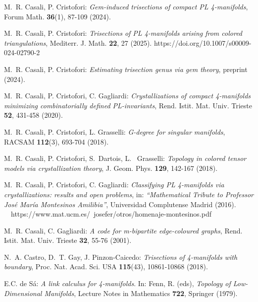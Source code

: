 \documentclass[12pt,a4paper]{article}
\begin{document}
\begin{thebibliography}{00}
{ 
M.~R. Casali, P. Cristofori: {\it Gem-induced trisections of compact PL 4-manifolds},  Forum Math. {\bf 36}(1), 87-109 (2024).  

M.~R. Casali, P. Cristofori: {\it Trisections of PL 4-manifolds arising from colored triangulations},  Mediterr. J. Math. {\bf 22}, 27 (2025). https://doi.org/10.1007/s00009-024-02790-2


M.~R. Casali, P. Cristofori: {\it Estimating trisection genus via gem theory}, 
preprint (2024). 


M.~R. Casali, P. Cristofori, C. Gagliardi:  {\it Crystallizations of compact 4-manifolds minimizing combinatorially defined PL-invariants}, Rend. Istit. Mat. Univ. Trieste {\bf 52}, 431-458 (2020).  %

M.~R. Casali, P. Cristofori, L. Grasselli: {\it G-degree for singular manifolds}, RACSAM  {\bf 112}(3), 693-704 (2018).  %

M.~R. Casali, P. Cristofori,  S.~Dartois, L.~ Grasselli: {\it Topology in colored tensor models  via crystallization theory},  J. Geom. Phys. {\bf 129}, 142-167  (2018). 


M.~R. Casali, P. Cristofori, C. Gagliardi: {\it Classifying PL 4-manifolds via crystallizations: results and open problems}, in:  {\em ``Mathematical Tribute to Professor Jos\'e Mar\'ia Montesinos Amilibia''}, Universidad Complutense Madrid (2016).  \ \ https://www.mat.ucm.es/~josefer/otros/homenaje-montesinos.pdf  %

M.~R. Casali, C. Gagliardi:  {\it A code for m-bipartite edge-coloured graphs}, Rend. Istit. Mat. Univ. Trieste {\bf 32},   55-76 (2001). 


N.~A. Castro,  D.~T. Gay,  J. Pinzon-Caicedo: {\it Trisections of 4-manifolds with boundary},  Proc. Nat. Acad. Sci. USA  {\bf 115}(43), 10861-10868 (2018).  %

 E.C. de S\'a: {\it A link calculus for 4-manifolds}. In: Fenn, R. (eds), \textit{Topology of Low-Dimensional Manifolds}, Lecture Notes in Mathematics {\bf 722}, Springer  (1979). %

}
\end{thebibliography}
\end{document}
